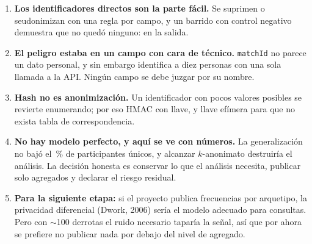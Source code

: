 \documentclass[11pt,letterpaper]{article}
\begin{document}
\begin{enumerate}[leftmargin=1.6em,itemsep=.4em]
  \item \textbf{Los identificadores directos son la parte fácil.} Se suprimen o
        seudonimizan con una regla por campo, y un barrido con control negativo
        demuestra que no quedó ninguno: \nFugas{} en la salida.
  \item \textbf{El peligro estaba en un campo con cara de técnico.} \texttt{matchId}
        no parece un dato personal, y sin embargo identifica a diez personas con
        una sola llamada a la API. Ningún campo se debe juzgar por su nombre.
  \item \textbf{Hash no es anonimización.} Un identificador con pocos valores
        posibles se revierte enumerando; por eso HMAC con llave, y llave efímera
        para que no exista tabla de correspondencia.
  \item \textbf{No hay modelo perfecto, y aquí se ve con números.} La
        generalización no bajó el \pctUnicosGen\,\% de participantes únicos, y
        alcanzar \(k\)-anonimato destruiría el análisis. La decisión honesta es
        conservar lo que el análisis necesita, publicar solo agregados y declarar el
        riesgo residual.
  \item \textbf{Para la siguiente etapa:} si el proyecto publica frecuencias por
        arquetipo, la privacidad diferencial (Dwork, 2006) sería el modelo
        adecuado para consultas. Pero con \(\sim\)100 derrotas el ruido necesario
        taparía la señal, así que por ahora se prefiere no publicar nada por debajo
        del nivel de agregado.
\end{enumerate}

\end{document}
